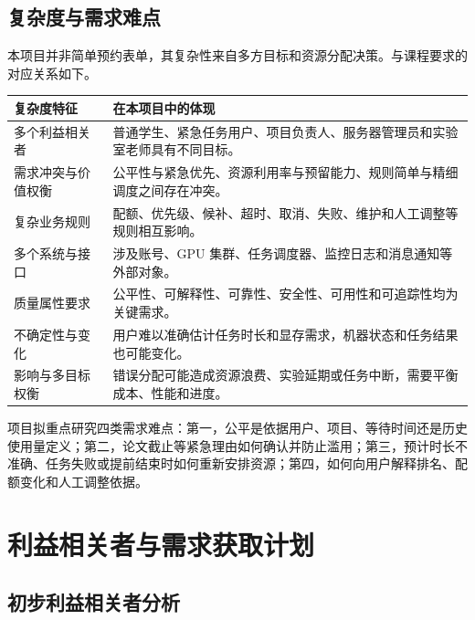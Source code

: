 \documentclass[UTF8,10.5pt,a4paper,fontset=mac]{ctexart}
\begin{document}
\subsection{复杂度与需求难点}

本项目并非简单预约表单，其复杂性来自多方目标和资源分配决策。与课程要求的对应关系如下。

\begin{table}[htbp]
\centering
\small
\begin{tabularx}{\linewidth}{L{3.15cm}Y}
\toprule
\textbf{复杂度特征} & \textbf{在本项目中的体现} \\
\midrule
多个利益相关者 & 普通学生、紧急任务用户、项目负责人、服务器管理员和实验室老师具有不同目标。 \\
需求冲突与价值权衡 & 公平性与紧急优先、资源利用率与预留能力、规则简单与精细调度之间存在冲突。 \\
复杂业务规则 & 配额、优先级、候补、超时、取消、失败、维护和人工调整等规则相互影响。 \\
多个系统与接口 & 涉及账号、GPU 集群、任务调度器、监控日志和消息通知等外部对象。 \\
质量属性要求 & 公平性、可解释性、可靠性、安全性、可用性和可追踪性均为关键需求。 \\
不确定性与变化 & 用户难以准确估计任务时长和显存需求，机器状态和任务结果也可能变化。 \\
影响与多目标权衡 & 错误分配可能造成资源浪费、实验延期或任务中断，需要平衡成本、性能和进度。 \\
\bottomrule
\end{tabularx}
\end{table}

项目拟重点研究四类需求难点：第一，公平是依据用户、项目、等待时间还是历史使用量定义；第二，论文截止等紧急理由如何确认并防止滥用；第三，预计时长不准确、任务失败或提前结束时如何重新安排资源；第四，如何向用户解释排名、配额变化和人工调整依据。

\section{利益相关者与需求获取计划}

\subsection{初步利益相关者分析}
\end{document}
